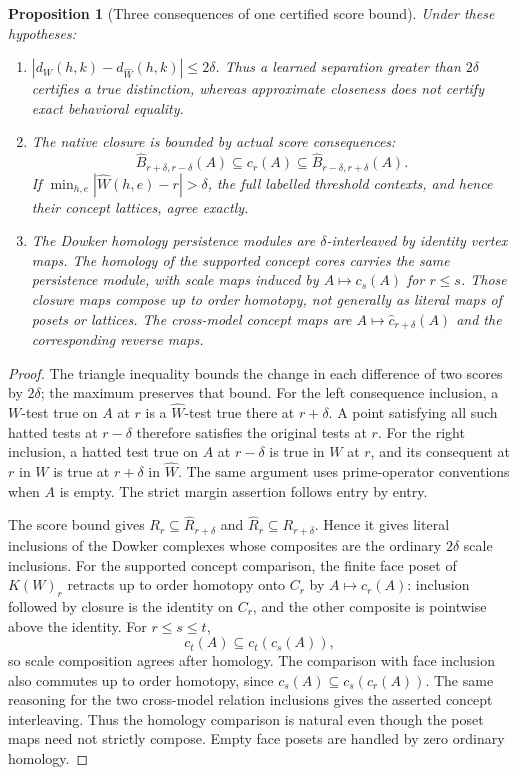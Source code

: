 \documentclass[11pt]{article}
\newtheorem{proposition}[theorem]{Proposition}
\theoremstyle{definition}\newtheorem{definition}[theorem]{Definition}
\theoremstyle{remark}\newtheorem{remark}[theorem]{Remark}
\begin{document}
\begin{proposition}[Three consequences of one certified score bound]
\label{prop:error}
Under these hypotheses:
\begin{enumerate}[label=(\roman*)]
\item $|d_W(h,k)-d_{\widehat W}(h,k)|\leq2\delta$. Thus a learned
separation greater than $2\delta$ certifies a true distinction, whereas
approximate closeness does not certify exact behavioral equality.
\item The native closure is bounded by actual score consequences:
\[
 \widehat B_{r+\delta,r-\delta}(A)
 \subseteq c_r(A)
 \subseteq\widehat B_{r-\delta,r+\delta}(A).
\]
If $\min_{h,e}|\widehat W(h,e)-r|>\delta$, the full labelled threshold
contexts, and hence their concept lattices, agree exactly.
\item The Dowker homology persistence modules are $\delta$-interleaved
by identity vertex maps. The homology of the supported concept cores
carries the same persistence module, with scale maps induced by
$A\mapsto c_s(A)$ for $r\leq s$. Those closure maps compose up to order
homotopy, not generally as literal maps of posets or lattices. The
cross-model concept maps are $A\mapsto\widehat c_{r+\delta}(A)$ and
the corresponding reverse maps.
\end{enumerate}
\end{proposition}
\begin{proof}
The triangle inequality bounds the change in each difference of two scores
by $2\delta$; the maximum preserves that bound. For the left consequence
inclusion, a $W$-test true on $A$ at $r$ is a $\widehat W$-test true there
at $r+\delta$. A point satisfying all such hatted tests at $r-\delta$
therefore satisfies the original tests at $r$. For the right inclusion,
a hatted test true on $A$ at $r-\delta$ is true in $W$ at $r$, and its
consequent at $r$ in $W$ is true at $r+\delta$ in $\widehat W$.
The same argument uses prime-operator conventions when $A$ is empty.
The strict margin assertion follows entry by entry.

The score bound gives $R_r\subseteq\widehat R_{r+\delta}$ and
$\widehat R_r\subseteq R_{r+\delta}$. Hence it gives literal inclusions
of the Dowker complexes whose composites are the ordinary $2\delta$
scale inclusions. For the supported concept comparison, the finite face
poset of $K(W)_r$ retracts up to order homotopy onto $C_r$ by
$A\mapsto c_r(A)$: inclusion followed by closure is the identity on
$C_r$, and the other composite is pointwise above the identity.
For $r\leq s\leq t$,
\[
 c_t(A)\subseteq c_t(c_s(A)),
\]
so scale composition agrees after homology. The comparison with face
inclusion also commutes up to order homotopy, since
$c_s(A)\subseteq c_s(c_r(A))$. The same reasoning for the two cross-model
relation inclusions gives the asserted concept interleaving. Thus the
homology comparison is natural even though the poset maps need not
strictly compose. Empty face posets are handled by zero ordinary homology.
\end{proof}
\end{document}
